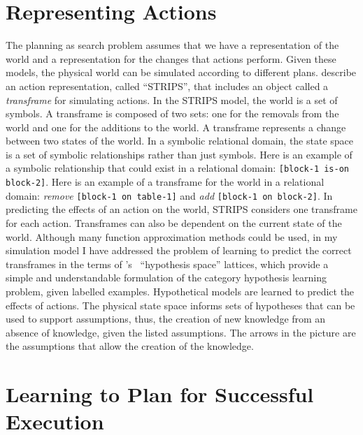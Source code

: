 \section{Representing Actions}

The planning as search problem assumes that we have a representation
of the world and a representation for the changes that actions
perform.  Given these models, the physical world can be simulated
according to different plans.  \cite{fikes:1972} describe an action
representation, called ``STRIPS'', that includes an object called a
\emph{transframe} for simulating actions.  In the STRIPS model, the
world is a set of symbols.  A transframe is composed of two sets: one
for the removals from the world and one for the additions to the
world.  A transframe represents a change between two states of the
world.  In a symbolic relational domain, the state space is a set of
symbolic relationships rather than just symbols.  Here is an example
of a symbolic relationship that could exist in a relational domain:
{\tt [block-1 is-on block-2]}.  Here is an example of a transframe for
the world in a relational domain: \emph{remove} {\tt [block-1 on
    table-1]} and \emph{add} {\tt [block-1 on block-2]}.  In
predicting the effects of an action on the world, STRIPS considers one
transframe for each action.  Transframes can also be dependent on the
current state of the world.  Although many function approximation
methods could be used, in my simulation model I have addressed the
problem of learning to predict the correct transframes in the terms of
{\mbox{\citeauthor{mitchell:1982}'s~\citeyearpar{mitchell:1982}}}
``hypothesis space'' lattices, which provide a simple and
understandable formulation of the category hypothesis learning
problem, given labelled examples.  Hypothetical models are learned to
predict the effects of actions.  The physical state space informs sets
of hypotheses that can be used to support assumptions, thus, the
creation of new knowledge from an absence of knowledge, given the
listed assumptions.  The arrows in the picture are the assumptions
that allow the creation of the knowledge.

\section{Learning to Plan for Successful Execution}

